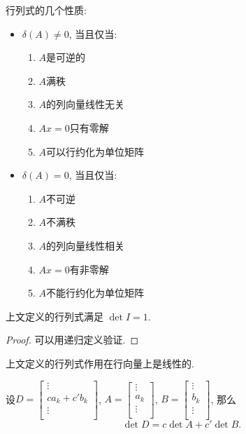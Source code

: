 
行列式的几个性质:
\begin{itemize}
    \item $\delta \left( A \right) \neq  0$, 当且仅当:
    \begin{enumerate}
        \item $A$是可逆的
        \item $A$满秩
        \item $A$的列向量线性无关
        \item $Ax=0$只有零解
        \item $A$可以行约化为单位矩阵
    \end{enumerate}
    \item $\delta \left( A \right) = 0$, 当且仅当:
    \begin{enumerate}
        \item $A$不可逆
        \item $A$不满秩
        \item $A$的列向量线性相关
        \item $Ax=0$有非零解
        \item $A$不能行约化为单位矩阵
    \end{enumerate}
\end{itemize}

\begin{proposition}
    上文定义的行列式满足 $\det I = 1$.
\end{proposition}
\begin{proof}
    可以用递归定义验证.
\end{proof}

\begin{proposition}
    上文定义的行列式作用在行向量上是线性的. 
    
    \vspace{.5em}
    设$D = \begin{bmatrix}
     \vdots\\
     c a_k + c' b_k\\
     \vdots\\
    \end{bmatrix}$, $A = \begin{bmatrix}
     \vdots\\
     a_k\\
     \vdots\\
    \end{bmatrix}$, $B = \begin{bmatrix}
     \vdots\\
     b_k\\
     \vdots\\
    \end{bmatrix}$, 那么
    \begin{equation}
        \det D = c \det A + c' \det B.
    \end{equation}
\end{proposition}

